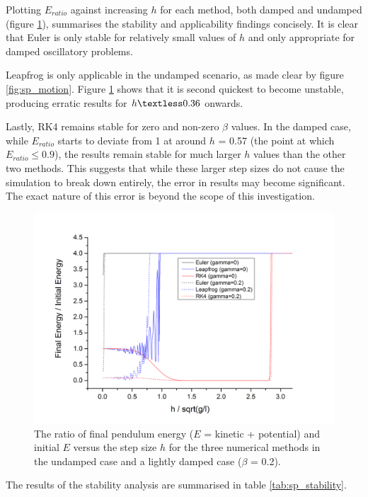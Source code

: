 \documentclass[11pt]{article}
\begin{document}
Plotting $E_{ratio}$ against increasing $h$ for each method, both damped and undamped (figure \ref{fig:e_vs_h}), summarises the stability and applicability findings concisely. It is clear that Euler is only stable for relatively small values of $h$ and only appropriate for damped oscillatory problems.

Leapfrog is only applicable in the undamped scenario, as made clear by figure \ref{fig:sp_motion}. Figure \ref{fig:e_vs_h} shows that it is second quickest to become unstable, producing erratic results for $h \textless 0.36$ onwards.

Lastly, RK4 remains stable for zero and non-zero $\beta$ values. In the damped case, while $E_{ratio}$ starts to deviate from 1 at around $h$ = 0.57 (the point at which $E_{ratio} \leq 0.9$), the results remain stable for much larger $h$ values than the other two methods. This suggests that while these larger step sizes do not cause the simulation to break down entirely, the error in results may become significant. The exact nature of this error is beyond the scope of this investigation.

\begin{figure}[h]
	\includegraphics[width=1.1\textwidth]{img/energy_ratio_vs_h.png}
	\caption{The ratio of final pendulum energy ($E$ = kinetic + potential) and initial $E$ versus the step size $h$ for the three numerical methods in the undamped case and a lightly damped case ($\beta$ = 0.2).}
	\label{fig:e_vs_h}
\end{figure}

The results of the stability analysis are summarised in table \ref{tab:sp_stability}.
\end{document}
